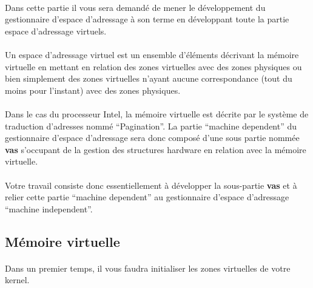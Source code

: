 \documentclass[10pt,a4wide]{article}
\begin{document}
\paragraph{}

Dans cette partie il vous sera demand\'e de mener le d\'eveloppement du
gestionnaire d'espace d'adressage \`a son terme en d\'eveloppant toute la
partie espace d'adressage virtuels.

\paragraph{}

Un espace d'adressage virtuel est un ensemble d'\'el\'ements d\'ecrivant
la m\'emoire virtuelle en mettant en relation des zones virtuelles avec des
zones physiques ou bien simplement des zones virtuelles n'ayant aucune
correspondance (tout du moins pour l'instant) avec des zones physiques.

\paragraph{}

Dans le cas du processeur Intel, la m\'emoire virtuelle est d\'ecrite
par le syst\`eme de traduction d'adresses nomm\'e ``Pagination''. La
partie ``machine dependent'' du gestionnaire d'espace d'adressage sera
donc compos\'e d'une sous partie nomm\'ee \textbf{vas} s'occupant de la
gestion des structures hardware en relation avec la m\'emoire virtuelle.

\paragraph{}

Votre travail consiste donc essentiellement \`a d\'evelopper la sous-partie
\textbf{vas} et \`a relier cette partie ``machine dependent'' au gestionnaire
d'espace d'adressage ``machine independent''.

\subsection{M\'emoire virtuelle}

\paragraph{}

Dans un premier temps, il vous faudra initialiser les zones virtuelles
de votre kernel.
\end{document}
